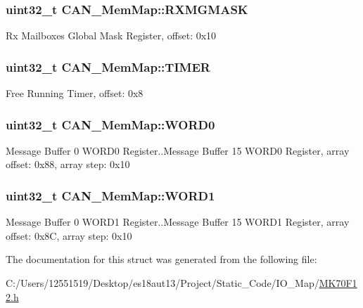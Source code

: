 \subsubsection[{R\+X\+M\+G\+M\+A\+S\+K}]{\setlength{\rightskip}{0pt plus 5cm}uint32\+\_\+t C\+A\+N\+\_\+\+Mem\+Map\+::\+R\+X\+M\+G\+M\+A\+S\+K}\label{struct_c_a_n___mem_map_aa788d49d34c42aeb411ed6b43f1a7c42}
Rx Mailboxes Global Mask Register, offset\+: 0x10 \hypertarget{struct_c_a_n___mem_map_a7cdd012a6030c4bf528cec65fddb71ca}{}
\subsubsection[{T\+I\+M\+E\+R}]{\setlength{\rightskip}{0pt plus 5cm}uint32\+\_\+t C\+A\+N\+\_\+\+Mem\+Map\+::\+T\+I\+M\+E\+R}\label{struct_c_a_n___mem_map_a7cdd012a6030c4bf528cec65fddb71ca}
Free Running Timer, offset\+: 0x8 \hypertarget{struct_c_a_n___mem_map_ac2b68cfbc9aeab141d20ae8bd73cd169}{}
\subsubsection[{W\+O\+R\+D0}]{\setlength{\rightskip}{0pt plus 5cm}uint32\+\_\+t C\+A\+N\+\_\+\+Mem\+Map\+::\+W\+O\+R\+D0}\label{struct_c_a_n___mem_map_ac2b68cfbc9aeab141d20ae8bd73cd169}
Message Buffer 0 W\+O\+R\+D0 Register..Message Buffer 15 W\+O\+R\+D0 Register, array offset\+: 0x88, array step\+: 0x10 \hypertarget{struct_c_a_n___mem_map_ae9343e0c532c0f3784d9960ffb8aa229}{}
\subsubsection[{W\+O\+R\+D1}]{\setlength{\rightskip}{0pt plus 5cm}uint32\+\_\+t C\+A\+N\+\_\+\+Mem\+Map\+::\+W\+O\+R\+D1}\label{struct_c_a_n___mem_map_ae9343e0c532c0f3784d9960ffb8aa229}
Message Buffer 0 W\+O\+R\+D1 Register..Message Buffer 15 W\+O\+R\+D1 Register, array offset\+: 0x8\+C, array step\+: 0x10 

The documentation for this struct was generated from the following file\+:\begin{DoxyCompactItemize}
\item 
C\+:/\+Users/12551519/\+Desktop/es18aut13/\+Project/\+Static\+\_\+\+Code/\+I\+O\+\_\+\+Map/\hyperlink{_m_k70_f12_8h}{M\+K70\+F12.\+h}\end{DoxyCompactItemize}

